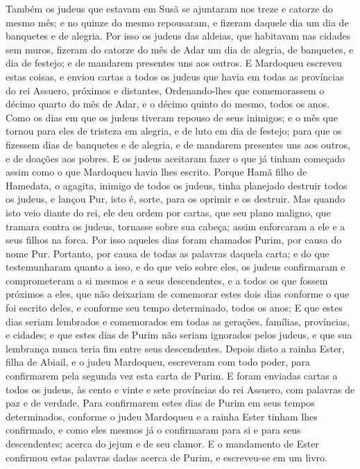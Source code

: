 {  Também os judeus que estavam em Susã se ajuntaram nos {} treze e catorze do mesmo mês; e no {} quinze do mesmo repousaram, e fizeram daquele dia um dia de banquetes e de alegria.
  Por isso os judeus das aldeias, que habitavam nas cidades sem muros, fizeram do {} catorze do mês de Adar um dia de alegria, de banquetes, e dia de festejo; e de mandarem presentes uns aos outros. %
  E Mardoqueu escreveu estas coisas, e enviou cartas a todos os judeus que havia em todas as províncias do rei Assuero, próximos e distantes,
  Ordenando-lhes que comemorassem o décimo quarto {} do mês de Adar, e o décimo quinto do mesmo, todos os anos.
  Como os dias em que os judeus tiveram repouso de seus inimigos; e o mês que tornou para eles de tristeza em alegria, e de luto em dia de festejo; para que os fizessem dias de banquetes e de alegria, e de mandarem presentes uns aos outros, e de doações aos pobres.
  E os judeus aceitaram fazer o que já tinham começado assim como o que Mardoqueu havia lhes escrito.
  Porque Hamã filho de Hamedata, o agagita, inimigo de todos os judeus, tinha planejado destruir todos os judeus, e lançou Pur, isto é, sorte, para os oprimir e os destruir.
  Mas quando isto veio diante do rei, ele deu ordem por cartas, que seu plano maligno, que tramara contra os judeus, tornasse sobre sua cabeça; assim enforcaram a ele e a seus filhos na forca.
  Por isso aqueles dias foram chamados Purim, por causa do nome Pur. Portanto, por causa de todas as palavras daquela carta; e do que testemunharam quanto a isso, e do que veio sobre eles,
  os judeus confirmaram e comprometeram a si mesmos e a seus descendentes, e a todos os que fossem próximos a eles, que não deixariam de comemorar estes dois dias conforme o que foi escrito deles, e conforme seu tempo determinado, todos os anos; %
  E que estes dias seriam lembrados e comemorados em todas as gerações, famílias, províncias, e cidades; e que estes dias de Purim não seriam ignorados pelos judeus, e que sua lembrança nunca teria fim entre seus descendentes.
  Depois disto a rainha Ester, filha de Abiail, e o judeu Mardoqueu, escreveram com todo poder, para confirmarem pela segunda vez esta carta de Purim.
  E foram enviadas cartas a todos os judeus, às cento e vinte e sete províncias do rei Assuero, com palavras de paz e de verdade,
  Para confirmarem estes dias de Purim em seus tempos determinados, conforme o judeu Mardoqueu e a rainha Ester tinham lhes confirmado, e como eles mesmos já o confirmaram para si e para seus descendentes; acerca do jejum e de seu clamor.
  E o mandamento de Ester confirmou estas palavras dadas acerca de Purim, e escreveu-se em um livro.
\par }

